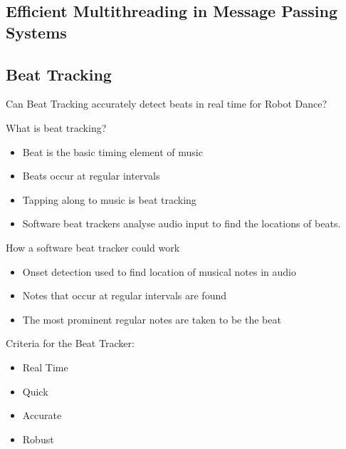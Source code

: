 \documentclass{beamer}
\begin{document}
	
	\subsection{Efficient Multithreading in Message Passing Systems}
	\begin{frame}
		\subsectionpage
	\end{frame}
	
	\subsection{Beat Tracking}
	\begin{frame}
		\subsectionpage
	\end{frame}
	\begin{frame}
		Can Beat Tracking accurately detect beats in real time for Robot Dance?
	\end{frame}
	\begin{frame}
		What is beat tracking?
		\begin{itemize}
			\item Beat is the basic timing element of music
			\item Beats occur at regular intervals
			\item Tapping along to music is beat tracking
			\item Software beat trackers analyse audio input to find the locations of beats.
		\end{itemize}
	\end{frame}
	\begin{frame}
		How a software beat tracker could work
		\begin{itemize}
			\item Onset detection used to find location of musical notes in audio
			\item Notes that occur at regular intervals are found
			\item The most prominent regular notes are taken to be the beat
		\end{itemize}
	\end{frame}
	\begin{frame}
		Criteria for the Beat Tracker:
		\begin{itemize}
			\item Real Time %
			\item Quick %
			\item Accurate %
			\item Robust	%
		\end{itemize}
	\end{frame}
\end{document}
